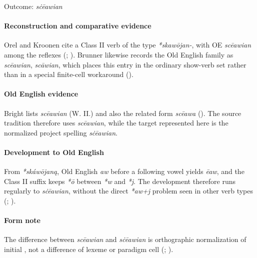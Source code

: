 \documentclass[
  british,
  a4paper,
]{article}
\begin{document}
Outcome: \emph{sċēawian}

\paragraph{Reconstruction and comparative
evidence}\label{reconstruction-and-comparative-evidence-10}

Orel and Kroonen cite a Class II verb of the type \emph{*skawōjan-},
with OE \emph{scēawian} among the reflexes (; ). Brunner likewise
records the Old English family as \emph{scēawian}, \emph{scāwian}, which
places this entry in the ordinary show-verb set rather than in a special
finite-cell workaround ().

\paragraph{Old English evidence}\label{old-english-evidence-10}

Bright lists \emph{scēawian} (W. II.) and also the related form
\emph{scēawa} ().
The source tradition therefore uses \emph{scēawian}, while the target
represented here is the normalized project spelling \emph{sċēawian}.

\paragraph{Development to Old
English}\label{development-to-old-english-10}

From \emph{*skáwōjaną}, Old English \emph{aw} before a following vowel
yields \emph{ēaw}, and the Class II suffix keeps \emph{*ō} between
\emph{*w} and \emph{*j}. The development therefore runs regularly to
\emph{sċēawian}, without the direct \emph{*aw+j} problem seen in other
verb types (;
).

\paragraph{Form note}\label{form-note-1}

The difference between \emph{scēawian} and \emph{sċēawian} is
orthographic normalization of initial \emph{}, not a difference of
lexeme or paradigm cell (;
).
\end{document}
